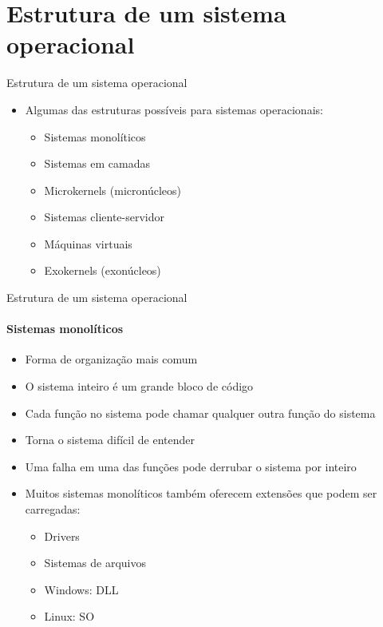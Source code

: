 \documentclass{beamer}
\begin{document}
\section{Estrutura de um sistema operacional}
\begin{frame}{Estrutura de um sistema operacional}
	\begin{itemize}
		\item Algumas das estruturas possíveis para sistemas operacionais:
		\begin{itemize}
			\item Sistemas monolíticos
			\item Sistemas em camadas
			\item Microkernels (micronúcleos)
			\item Sistemas cliente-servidor
			\item Máquinas virtuais
			\item Exokernels (exonúcleos)
		\end{itemize}
	\end{itemize}
\end{frame}
\begin{frame}{Estrutura de um sistema operacional}
	\framesubtitle{Sistemas monolíticos}
	\begin{itemize}
		\item Forma de organização mais comum
		\item O sistema inteiro é um grande bloco de código
		\item Cada função no sistema pode chamar qualquer outra função do sistema
		\item Torna o sistema difícil de entender
		\item Uma falha em uma das funções pode derrubar o sistema por inteiro
		\item Muitos sistemas monolíticos também oferecem extensões que podem ser carregadas:
		\begin{itemize}
			\item Drivers
			\item Sistemas de arquivos
			\item Windows: DLL
			\item Linux: SO
		\end{itemize}
	\end{itemize}
\end{frame}
\end{document}
